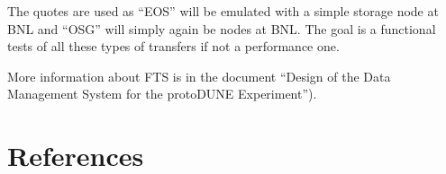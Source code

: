 \documentclass[pdftex,12pt,letter]{article}
\begin{document}
The quotes are used as ``EOS'' will be emulated with a simple storage
node at BNL and ``OSG'' will simply again be nodes at BNL.  The goal
is a functional tests of all these types of transfers if not a
performance one.

More information about FTS is in the document ``Design of the Data
Management System for the protoDUNE Experiment'').

\section{References}

\end{document}
